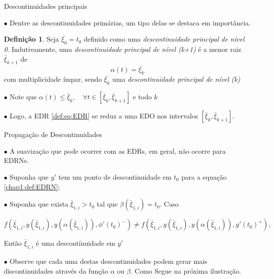 \documentclass{beamer}
\theoremstyle{plain}
\theoremstyle{definition}
\newtheorem{defi}{Definição}
\begin{document}


\begin{frame}{Descontinuidades principais}

    $\bullet$ Dentre as descontinuidades primárias, um tipo delas se destaca em importância.

    \begin{defi}
        \label{chap2:def:principal_descontinuity}
    Seja $\bar{\xi_0} = t_0$ definido como uma \textit{descontinuidade principal de nível 0}. Indutivamente, uma \textit{descontinuidade principal de nível (k+1)} é a menor raiz $\bar{\xi}_{k+1}$ de 
        \[
            \alpha(t) = \bar{\xi_k}
        \]
        com multiplicidade ímpar, sendo $\bar{\xi_k}$ uma \textit{descontinuidade principal de nível (k)}
    \end{defi}


    $\bullet$ Note que $ \alpha(t) \leq \bar{\xi}_{k}, \quad \forall t \in\left[\bar{\xi}_{k}, \bar{\xi}_{k+1}\right] $ e todo $k$

    $\bullet$ Logo, a EDR \eqref{def:eq:EDR} se reduz a uma EDO nos intervalos $\left[\bar{\xi}_{k}, \bar{\xi}_{k+1}\right]$. 

\end{frame}



\begin{frame}{Propagação de Descontinuidades}
     
    $\bullet$ A suavização que pode ocorrer com as EDRs, em geral, não ocorre para EDRNs. 

    $\bullet$ Suponha que $y'$ tem um ponto de descontinuidade em $t_0$ para a equação \ref{chap1:def:EDRN};

    $\bullet$ Suponha que exista $\bar{\xi}_{1, i} > t_0$ tal que $\beta(\bar{\xi}_{1, i}) = t_0$. Caso

    \footnotesize
    \begin{equation}
        f(\bar{\xi}_{1, i}, y(\bar{\xi}_{1, i}), y(\alpha(\bar{\xi}_{1, i})), \phi'(t_0)^-) \neq 
        f(\bar{\xi}_{1, i}, y(\bar{\xi}_{1, i}), y(\alpha(\bar{\xi}_{1, i})), y'(t_0)^+),
        \label{chap2:eq:disco:edrn}
    \end{equation}

    \normalsize
    Então $\bar{\xi}_{1, i}$ é uma descontínuidade em $y'$

    $\bullet$ Observe que cada uma destas descontinuidades podem gerar mais discontinuidades através da função $\alpha$ ou $\beta$. Como Segue na próxima ilustração.

\end{frame}
\end{document}
